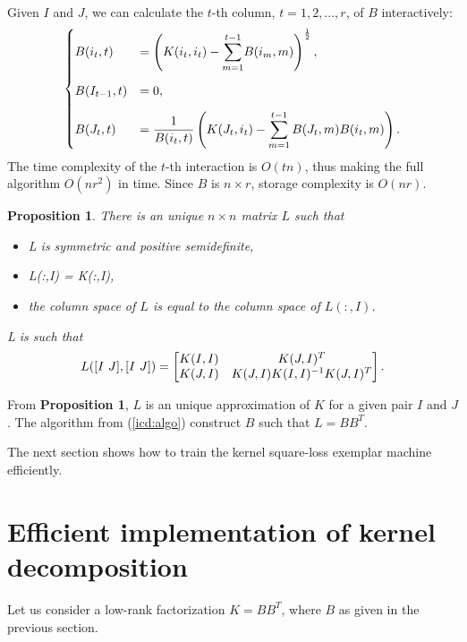 \documentclass[12pt,letterpaper]{article}
\newtheorem{proposition}{Proposition}
\begin{document}
Given $I$ and $J$, we can calculate the $t$-th column, $t=1,2,...,r$, of $B$ interactively:
\begin{align}
\begin{cases}
\vspace{3 mm}
B(i_t, t) &= \left(K(i_t,i_t)-\displaystyle{\sum_{m=1}^{t-1}} B(i_{m},m)  \right)^{\frac{1}{2}},\\
\vspace{3 mm}
B(I_{t-1},t) &= 0,\\
B(J_t, t) &= \dfrac{1}{B(i_t,t)}\left(K(J_t,i_t)-\displaystyle{\sum_{m=1}^{t-1}B(J_t,m)B(i_t,m)}\right).
\end{cases}\label{icd:algo}
\end{align}
The time complexity of the $t$-th interaction is $O(tn)$, thus making the full algorithm $O(nr^2)$ in time. Since $B$ is $n\times r$, storage complexity is $O(nr)$.
\begin{proposition}
There is an unique $n\times n$ matrix $L$ such that
\begin{itemize}
\item L is symmetric and positive semidefinite,
\item L(:,I) = K(:,I),
\item the column space of $L$ is equal to the column space of $L(:,I)$.
\end{itemize}
L is such that 
\begin{equation}
L([I \ J],[I\ J]) = \left[\begin{matrix}K(I,I) & K(J,I)^T\\ K(J,I) & K(J,I)K(I,I)^{-1}K(J,I)^T\end{matrix}\right].
\end{equation}
\end{proposition}
From \textbf{Proposition 1}, $L$ is an unique approximation of $K$ for a given pair $I$ and $J$. The algorithm from (\ref{icd:algo}) construct $B$ such that $L=BB^T$.


The next section shows how to train the kernel square-loss exemplar machine efficiently.

\section{Efficient implementation of kernel decomposition}

Let us consider a low-rank factorization $K=BB^T$, where $B$ as given in the previous section. 
\end{document}
